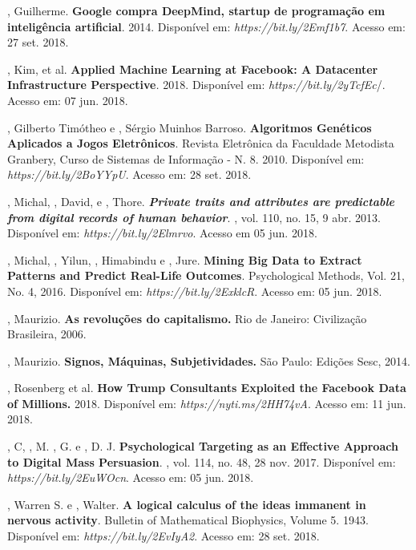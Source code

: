 , Guilherme. \textbf{Google compra DeepMind, startup de programação
em inteligência artificial}. 2014. Disponível em: \emph{https://bit.ly/2Emf1b7}. Acesso em: 27 set. 2018.

, Kim, et al. \textbf{Applied Machine Learning at Facebook: A
Datacenter Infrastructure Perspective}\emph{.} 2018. Disponível em: \emph{https://bit.ly/2yTcfEc}/. Acesso em: 07 jun. 2018.

, Gilberto Timótheo e , Sérgio Muinhos Barroso.
\textbf{Algoritmos Genéticos Aplicados a Jogos Eletrônicos}. Revista
Eletrônica da Faculdade Metodista Granbery, Curso de Sistemas de
Informação - N. 8. 2010. Disponível em: \emph{https://bit.ly/2BoYYpU}. Acesso em: 28 set. 2018.

, Michal, , David, e , Thore.
\emph{\textbf{Private traits and attributes are predictable from digital
records of human behavior}}. , vol. 110, no. 15, 9 abr. 2013.
Disponível em: \emph{https://bit.ly/2Elmrvo}. Acesso em 05 jun. 2018.

, Michal, , Yilun, , Himabindu e , Jure.
\textbf{Mining Big Data to Extract Patterns and Predict Real-Life
Outcomes}. Psychological Methods, Vol. 21, No. 4, 2016. Disponível em:
\emph{https://bit.ly/2ExklcR}. Acesso em: 05 jun. 2018.

, Maurizio. \textbf{As revoluções do capitalismo.} Rio de
Janeiro: Civilização Brasileira, 2006.

, Maurizio. \textbf{Signos, Máquinas, Subjetividades.} São
Paulo: Edições Sesc, 2014.

, Rosenberg et al. \textbf{How Trump Consultants Exploited the
Facebook Data of Millions.} 2018. Disponível em: \emph{https://nyti.ms/2HH74vA}. Acesso em: 11 jun. 2018.

, C, , M. , G. e , D. J.
\textbf{Psychological Targeting as an Effective Approach to Digital Mass
Persuasion}. , vol. 114, no. 48, 28 nov. 2017. Disponível em:
\emph{https://bit.ly/2EuWOcn}. Acesso em: 05 jun. 2018.

, Warren S. e , Walter. \textbf{A logical calculus of the
ideas immanent in nervous activity}. Bulletin of Mathematical
Biophysics, Volume 5. 1943. Disponível em:
\emph{https://bit.ly/2EvIyA2}. Acesso em: 28 set. 2018.

